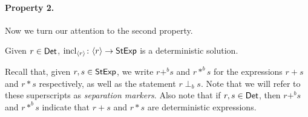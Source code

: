 \documentclass[orivec,envcountsect,envcountsame]{llncs}
\begin{document}
\paragraph*{Property 2.} Now we turn our attention to the second property.

\begin{lemma}%
	\label{lem:deterministic_fundamental_theorem}
	Given \(r \in \mathsf{Det}\), \(\operatorname{incl}_{\langle r\rangle} \colon \langle r \rangle \to \mathsf{StExp}\) is a deterministic solution.
\end{lemma}

Recall that, given \(r,s \in \mathsf{StExp}\), we write \(r +^b s\) and \(r *^b s\) for the expressions \(r + s\) and \(r * s\) respectively, as well as the statement \(r \perp_b s\).
Note that we will refer to these superscripts as \emph{separation markers}.
Also note that if \(r,s \in \mathsf{Det}\), then \(r +^b s\) and \(r *^b s\) indicate that \(r + s\) and \(r * s\) are deterministic expressions.
\end{document}
